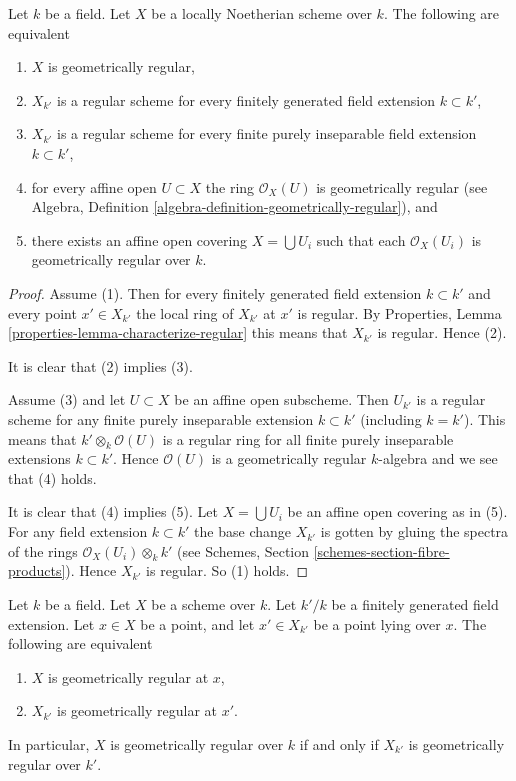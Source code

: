 \begin{lemma}
\label{lemma-geometrically-regular}
Let $k$ be a field.
Let $X$ be a locally Noetherian scheme over $k$.
The following are equivalent
\begin{enumerate}
\item $X$ is geometrically regular,
\item $X_{k'}$ is a regular scheme for every finitely generated field
extension $k \subset k'$,
\item $X_{k'}$ is a regular scheme for every finite purely inseparable
field extension $k \subset k'$,
\item for every affine open $U \subset X$ the ring $\mathcal{O}_X(U)$
is geometrically regular (see
Algebra, Definition \ref{algebra-definition-geometrically-regular}), and
\item there exists an affine open covering $X = \bigcup U_i$ such that
each $\mathcal{O}_X(U_i)$ is geometrically regular over $k$.
\end{enumerate}
\end{lemma}

\begin{proof}
Assume (1). Then for every finitely generated field extension
$k \subset k'$ and
every point $x' \in X_{k'}$ the local ring of $X_{k'}$ at $x'$
is regular. By Properties, Lemma \ref{properties-lemma-characterize-regular}
this means that $X_{k'}$ is regular. Hence (2).

\medskip\noindent
It is clear that (2) implies (3).

\medskip\noindent
Assume (3) and let $U \subset X$ be an affine open subscheme.
Then $U_{k'}$ is a regular scheme for any finite purely inseparable
extension $k \subset k'$ (including $k = k'$). This means that
$k' \otimes_k \mathcal{O}(U)$ is a regular ring for all
finite purely inseparable extensions $k \subset k'$. Hence
$\mathcal{O}(U)$ is a geometrically regular $k$-algebra
and we see that (4) holds.

\medskip\noindent
It is clear that (4) implies (5). Let $X = \bigcup U_i$ be an affine
open covering as in (5). For any field extension $k \subset k'$ the base
change $X_{k'}$ is gotten by gluing the spectra of the
rings $\mathcal{O}_X(U_i) \otimes_k k'$ (see
Schemes, Section \ref{schemes-section-fibre-products}).
Hence $X_{k'}$ is regular. So (1) holds.
\end{proof}

\begin{lemma}
\label{lemma-geometrically-regular-upstairs}
Let $k$ be a field.
Let $X$ be a scheme over $k$.
Let $k'/k$ be a finitely generated field extension.
Let $x \in X$ be a point, and let $x' \in X_{k'}$ be a point lying over $x$.
The following are equivalent
\begin{enumerate}
\item $X$ is geometrically regular at $x$,
\item $X_{k'}$ is geometrically regular at $x'$.
\end{enumerate}
In particular, $X$ is geometrically regular over $k$ if and only if
$X_{k'}$ is geometrically regular over $k'$.
\end{lemma}

